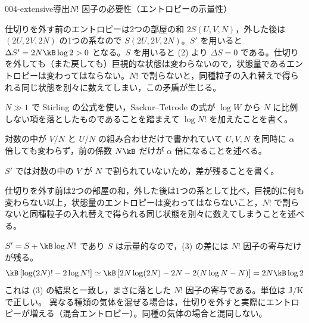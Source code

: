 \documentclass[uplatex,dvipdfmx,a4paper,11pt]{jsarticle}
\begin{document}
\begin{mondai}{004-extensive}{導出}{$N!$ 因子の必要性（エントロピーの示量性）}
\begin{tadashii}
 仕切りを外す前のエントロピーは2つの部屋の和 $2S(U,V,N)$，外した後は $(2U,2V,2N)$ の1つの系なので $S(2U,2V,2N)$。$S'$ を用いると $\Delta S'=2N\kB\log2>0$ となる。$S$ を用いると (2) より $\Delta S=0$ である。仕切りを外しても（また戻しても）巨視的な状態は変わらないので，状態量であるエントロピーは変わってはならない。$N!$ で割らないと，同種粒子の入れ替えで得られる同じ状態を別々に数えてしまい，この矛盾が生じる。
\begin{ronten}
  \item {} $N\gg1$ で Stirling の公式を使い，Sackur--Tetrode の式が $\log W$ から $N$ に比例しない項を落としたものであることを踏まえて $\log N!$ を加えたことを書く。
  \item {} 対数の中が $V/N$ と $U/N$ の組み合わせだけで書かれていて $U,V,N$ を同時に $\alpha$ 倍しても変わらず，前の係数 $N\kB$ だけが $\alpha$ 倍になることを述べる。
  \item {} $S'$ では対数の中の $V$ が $N$ で割られていないため，差が残ることを書く。
  \item {} 仕切りを外す前は2つの部屋の和，外した後は1つの系として比べ，巨視的に何も変わらない以上，状態量のエントロピーは変わってはならないこと，$N!$ で割らないと同種粒子の入れ替えで得られる同じ状態を別々に数えてしまうことを述べる。
\end{ronten}
\kenzan $S'=S+\kB\log N!$ であり $S$ は示量的なので，(3) の差には $N!$ 因子の寄与だけが残る。
\[\kB\left[\log(2N)!-2\log N!\right]\simeq\kB\left[2N\log(2N)-2N-2(N\log N-N)\right]=2N\kB\log2\]
これは (3) の結果と一致し，まさに落とした $N!$ 因子の寄与である。単位は $\unit{\joule\per\kelvin}$ で正しい。
\tsumazuki 異なる種類の気体を混ぜる場合は，仕切りを外すと実際にエントロピーが増える（混合エントロピー）。同種の気体の場合と混同しない。
\end{tadashii}
\end{mondai}
\end{document}
